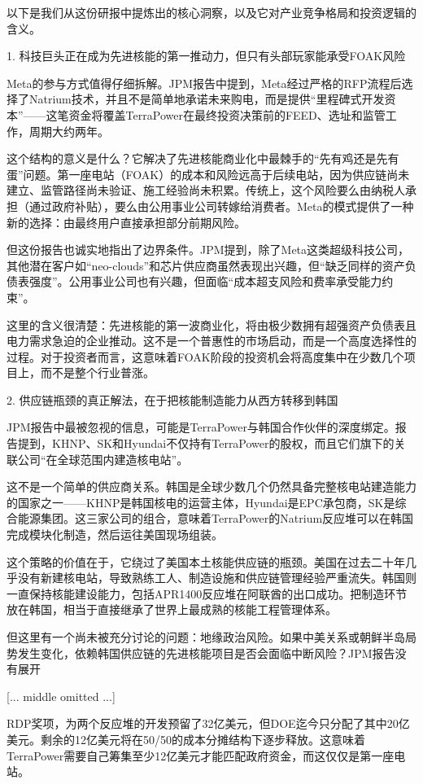 \documentclass[11pt]{ctexart}
\begin{document}
以下是我们从这份研报中提炼出的核心洞察，以及它对产业竞争格局和投资逻辑的含义。

1. 科技巨头正在成为先进核能的第一推动力，但只有头部玩家能承受FOAK风险

Meta的参与方式值得仔细拆解。JPM报告中提到，Meta经过严格的RFP流程后选择了Natrium技术，并且不是简单地承诺未来购电，而是提供“里程碑式开发资本”——这笔资金将覆盖TerraPower在最终投资决策前的FEED、选址和监管工作，周期大约两年。

这个结构的意义是什么？它解决了先进核能商业化中最棘手的“先有鸡还是先有蛋”问题。第一座电站（FOAK）的成本和风险远高于后续电站，因为供应链尚未建立、监管路径尚未验证、施工经验尚未积累。传统上，这个风险要么由纳税人承担（通过政府补贴），要么由公用事业公司转嫁给消费者。Meta的模式提供了一种新的选择：由最终用户直接承担部分前期风险。

但这份报告也诚实地指出了边界条件。JPM提到，除了Meta这类超级科技公司，其他潜在客户如“neo-clouds”和芯片供应商虽然表现出兴趣，但“缺乏同样的资产负债表强度”。公用事业公司也有兴趣，但面临“成本超支风险和费率承受能力约束”。

这里的含义很清楚：先进核能的第一波商业化，将由极少数拥有超强资产负债表且电力需求急迫的企业推动。这不是一个普惠性的市场启动，而是一个高度选择性的过程。对于投资者而言，这意味着FOAK阶段的投资机会将高度集中在少数几个项目上，而不是整个行业普涨。

2. 供应链瓶颈的真正解法，在于把核能制造能力从西方转移到韩国

JPM报告中最被忽视的信息，可能是TerraPower与韩国合作伙伴的深度绑定。报告提到，KHNP、SK和Hyundai不仅持有TerraPower的股权，而且它们旗下的关联公司“在全球范围内建造核电站”。

这不是一个简单的供应商关系。韩国是全球少数几个仍然具备完整核电站建造能力的国家之一——KHNP是韩国核电的运营主体，Hyundai是EPC承包商，SK是综合能源集团。这三家公司的组合，意味着TerraPower的Natrium反应堆可以在韩国完成模块化制造，然后运往美国现场组装。

这个策略的价值在于，它绕过了美国本土核能供应链的瓶颈。美国在过去二十年几乎没有新建核电站，导致熟练工人、制造设施和供应链管理经验严重流失。韩国则一直保持核能建设能力，包括APR1400反应堆在阿联酋的出口成功。把制造环节放在韩国，相当于直接继承了世界上最成熟的核能工程管理体系。

但这里有一个尚未被充分讨论的问题：地缘政治风险。如果中美关系或朝鲜半岛局势发生变化，依赖韩国供应链的先进核能项目是否会面临中断风险？JPM报告没有展开

[... middle omitted ...]

RDP奖项，为两个反应堆的开发预留了32亿美元，但DOE迄今只分配了其中20亿美元。剩余的12亿美元将在50/50的成本分摊结构下逐步释放。这意味着TerraPower需要自己筹集至少12亿美元才能匹配政府资金，而这仅仅是第一座电站。
\end{document}
